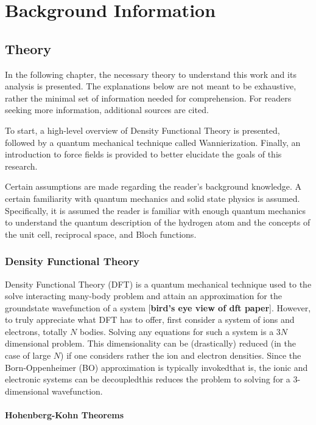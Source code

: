 \chapter{Background Information}    
    
    \section{Theory}
    
    In the following chapter, the necessary theory to understand this work and its analysis is presented. The explanations below are not meant to be exhaustive, rather the minimal set of information needed for comprehension. For readers seeking more information, additional sources are cited.
    
    To start, a high-level overview of Density Functional Theory is presented, followed by a quantum mechanical technique called Wannierization. Finally, an introduction to force fields is provided to better elucidate the goals of this research.
    
    Certain assumptions are made regarding the reader's background knowledge. A certain familiarity with quantum mechanics and solid state physics is assumed. Specifically, it is assumed the reader is familiar with enough quantum mechanics to understand the quantum description of the hydrogen atom and the concepts of the unit cell, reciprocal space, and Bloch functions. 
    
    \subsection{Density Functional Theory}
    
    Density Functional Theory (DFT) is a quantum mechanical technique used to the solve interacting many-body problem and attain an approximation for the groundstate wavefunction of a system [\textbf{bird's eye view of dft paper}]. However, to truly appreciate what DFT has to offer, first consider a system of ions and electrons, totally $N$ bodies. Solving any equations for such a system is a $3N$ dimensional problem. This dimensionality can be (drastically) reduced (in the case of large $N$) if one considers rather the ion and electron densities. Since the Born-Oppenheimer (BO) approximation is typically invoked\textemdash that is, the ionic and electronic systems can be decoupled\textemdash this reduces the problem to solving for a 3-dimensional wavefunction.
    
        \subsubsection{Hohenberg-Kohn Theorems} 
        
